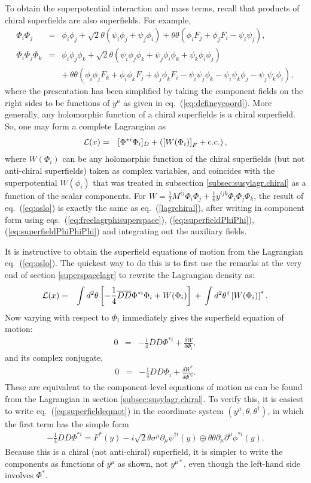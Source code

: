 \documentclass[11pt]{article}
\def\BDminus{-}
\def\BDminus{+}
\def\BDminus{\ominus}
\def\BDminus{\oplus}
\def\beq{\begin{eqnarray}}
\def\eeq{\end{eqnarray}}
\def\Dcon{\overline D}
\begin{document}
To obtain the superpotential interaction and mass terms, recall that products of 
chiral superfields are also superfields. For example,
\beq
\Phi_i \Phi_j &=& \phi_i \phi_j 
+ \sqrt{2}\theta (\psi_i \phi_j + \psi_j \phi_i)
+ \theta\theta (\phi_i F_j + \phi_j F_i - \psi_i \psi_j)
,
\label{eq:superfieldPhiPhi}
\\
\Phi_i \Phi_j \Phi_k &=& \phi_i \phi_j \phi_k 
+ \sqrt{2}\theta (\psi_i \phi_j \phi_k 
+ \psi_j \phi_i \phi_k + \psi_k \phi_i \phi_j)
\nonumber 
\\ &&
+ \,\theta\theta (\phi_i \phi_j F_k + \phi_i \phi_k F_j + 
\phi_j \phi_k F_i 
- \psi_i \psi_j \phi_k - \psi_i \psi_k \phi_j
- \psi_j \psi_k \phi_i
),
\label{eq:superfieldPhiPhiPhi}
\eeq
where the presentation has been simplified by taking the component fields 
on the right sides to be functions of $y^\mu$ as given in 
eq.~(\ref{eq:defineycoord}). More generally, any holomorphic function of
a chiral superfields is a chiral superfield.
So, one may form a complete Lagrangian as
\beq
{\cal L}(x) &=& [\Phi^{*i} \Phi_i]_D + 
\left ( \left  [ W(\Phi_i) \right ]_F
+ {\rm c.c.} \right ),
\label{eq:oslo}
\eeq
where $W(\Phi_i)$ 
can be any holomorphic function 
of the chiral superfields (but not anti-chiral superfields) 
taken as complex variables, and
coincides with the superpotential $W(\phi_i)$ that was treated 
in subsection \ref{subsec:susylagr.chiral} as a function of the scalar components.
For $W = \frac{1}{2} M^{ij} \Phi_i \Phi_j
+ \frac{1}{6} y^{ijk} \Phi_i \Phi_j \Phi_k$, the result of 
eq.~(\ref{eq:oslo})
is exactly the same as eq.~(\ref{lagrchiral}), after writing in 
component form using eqs.~(\ref{eq:freelagrphisuperspace}), 
(\ref{eq:superfieldPhiPhi}), 
(\ref{eq:superfieldPhiPhiPhi}) and integrating out the auxiliary fields. 

It is instructive to obtain the superfield equations of motion
from the Lagrangian eq.~(\ref{eq:oslo}). The quickest way to do this
is to first use the remarks at the very end of section \ref{superspacelagr}
to rewrite the Lagrangian density as:
\beq
{\cal L}(x) &=& 
\int d^2\theta \left [ -\frac{1}{4} \Dcon\Dcon \Phi^{*i} \Phi_i  +
W(\Phi_i) \right ]
\,+ \,
\int d^2\theta^\dagger \left [W(\Phi_i)\right ]^*.
\eeq
Now varying with respect to $\Phi_i$ immediately gives the superfield equation of
motion:
\beq
0 &=& -\frac{1}{4} \Dcon\Dcon \Phi^{*i} + \frac{\delta W}{\delta \Phi_i} ,
\label{eq:superfieldeqmot}
\eeq
and its complex conjugate,
\beq
0&=& -\frac{1}{4} DD \Phi_i + \frac{\delta W^*}{\delta \Phi^{*i}} .
\label{eq:superfieldeqmotCON}
\eeq
These are equivalent to the component-level equations of motion as can be found from the
Lagrangian in section \ref{subsec:susylagr.chiral}. To verify this,
it is easiest to write eq.~(\ref{eq:superfieldeqmot})
in the coordinate system $(y^\mu, \theta, \theta^\dagger)$, 
in which the first term has the simple form
\beq
-\frac{1}{4} \Dcon\Dcon \Phi^{*i}
= F^*(y) - i \sqrt{2} \theta\sigma^\mu \partial_\mu \psi^{\dagger i}(y)
\BDminus \theta\theta \partial_\mu \partial^\mu \phi^{*i}(y) .
\eeq
Because this is a chiral (not anti-chiral) superfield, it is simpler to
write the components as functions of $y^\mu$ as shown, 
not $y^{\mu *}$, even though the left-hand 
side involves $\Phi^*$. 
\end{document}
